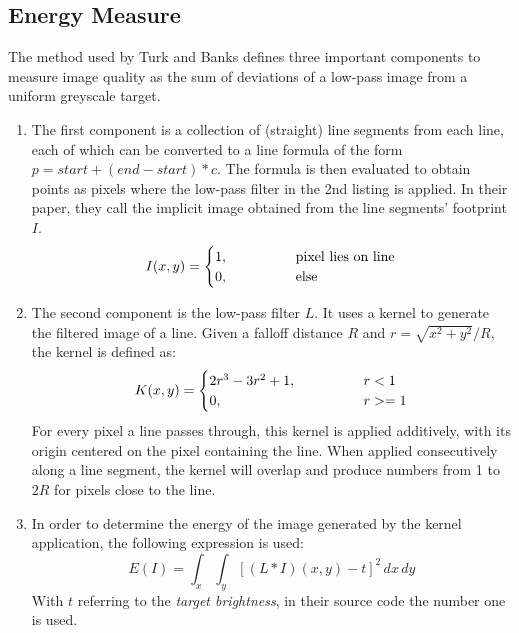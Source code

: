 \subsection{Energy Measure}
The method used by Turk and Banks defines three important components to measure image quality as the sum of deviations of a low-pass image from a uniform greyscale target.
\begin{enumerate}
    \item The first component is a collection of (straight) line segments from each line,
    each of which can be converted to a line formula of the form $p = start + (end - start) * c$.
    The formula is then evaluated to obtain points as pixels where the low-pass filter in the 2nd listing is applied.
    In their paper, they call the implicit image obtained from the line segments' footprint $I$.
    \begin{equation*}
        I(x,y) = \begin{cases}
            1, \kern4em & \text{pixel lies on line}\\
            0,          & \text{else}
    \end{cases}
    \end{equation*}
    
    \item The second component is the low-pass filter $L$.
    It uses a kernel to generate the filtered image of a line.
    Given a falloff distance $R$ and $r=\sqrt{x^2+y^2} / R$, the kernel is defined as:
    \begin{equation*}
        K(x,y) = \begin{cases}
            2r^3 - 3r^2 + 1, \kern4em & r < 1\\
            0,               & r >= 1
        \end{cases}
    \end{equation*}
    For every pixel a line passes through, this kernel is applied additively, with its origin centered on the pixel containing the line.
    When applied consecutively along a line segment, the kernel will overlap and produce numbers from 1 to $2R$ for pixels close to the line.
    
    \item In order to determine the energy of the image generated by the kernel application, the following expression is used:
    \begin{equation*}
        E(I) = \int_x\int_y\left[(L\ast I)(x,y)-t\right]^2\,dx\,dy
    \end{equation*}
    With $t$ referring to the \textit{target brightness}, in their source code the number one is used.
\end{enumerate}


